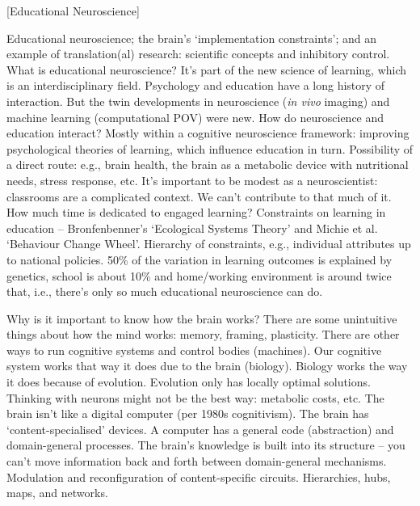 [Educational Neuroscience]

\begin{affils}
\end{affils}

Educational neuroscience; the brain's `implementation constraints'; and an example of
translation(al) research: scientific concepts and inhibitory control.
What is educational neuroscience?
It's part of the new science of learning, which is an interdisciplinary field.
Psychology and education have a long history of interaction.
But the twin developments in neuroscience (\emph{in vivo} imaging) and machine learning
(computational POV) were new.
How do neuroscience and education interact?
Mostly within a cognitive neuroscience framework: improving psychological theories of
learning, which influence education in turn.
Possibility of a direct route: e.g., brain health, the brain as a metabolic device with
nutritional needs, stress response, etc. It's important to be modest as a
neuroscientist: classrooms are a complicated context.
We can't contribute to that much of it.
How much time is dedicated to engaged learning?
Constraints on learning in education -- Bronfenbenner's `Ecological Systems Theory' and
Michie et al.
`Behaviour Change Wheel'.
Hierarchy of constraints, e.g., individual attributes up to national policies.
50\% of the variation in learning outcomes is explained by genetics, school is about 10\% and
home/working environment is around twice that, i.e., there's only so much educational
neuroscience can do.

Why is it important to know how the brain works?
There are some unintuitive things about how the mind works: memory, framing,
plasticity.
There are other ways to run cognitive systems and control bodies (machines).
Our cognitive system works that way it does due to the brain (biology).
Biology works the way it does because of evolution.
Evolution only has locally optimal solutions.
Thinking with neurons might not be the best way: metabolic costs, etc. The brain isn't
like a digital computer (per 1980s cognitivism).
The brain has `content-specialised' devices.
A computer has a general code (abstraction) and domain-general processes.
The brain's knowledge is built into its structure -- you can't move information back
and forth between domain-general mechanisms.
Modulation and reconfiguration of content-specific circuits.
Hierarchies, hubs, maps, and networks.

